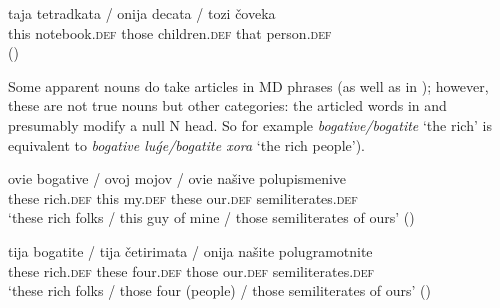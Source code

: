 \documentclass[output=paper,
colorlinks,
citecolor=brown,
newtxmath
]{langscibook}
\begin{document}
\ea
\gll \minsp{*} taja tetradkata / \minsp{*} onija decata / \minsp{*} tozi čoveka \\
{} this notebook.\textsc{def} { } {} those children.\textsc{def} { } {} that person.\textsc{def} \\  \hfill()
\z

\noindent Some apparent nouns do take articles in  MD phrases (as well as in ); however, these are not true nouns but other categories: the articled words in   and  presumably  modify a null N head. So for example \textit{bogative/bogatite} `the rich' is equivalent to \textit{bogative luǵe/bogatite xora} ‘the rich people’).


\ea \label{bogative}
\gll ovie bogative / ovoj mojov / ovie našive 	polupismenive \\
these rich.\textsc{def} { } this my.\textsc{def} { } these our.\textsc{def} semiliterates.\textsc{def} \\
\glt `these rich folks / this guy of mine / those semiliterates of ours'
\glt \hfill()
\z


\ea \label{bogatite}
\gll tija bogatite / tija četirimata / onija našite 	polugramotnite \\
these rich.\textsc{def} { } these four.\textsc{def} { } those our.\textsc{def} semiliterates.\textsc{def} \\
\glt `these rich folks / those four (people) / those semiliterates of ours'
\glt \hfill()
\z
\end{document}
